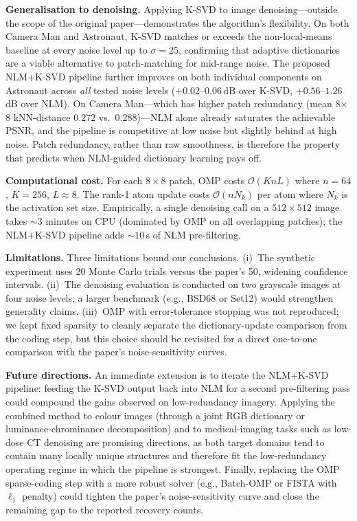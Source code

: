 \documentclass[conference]{IEEEtran}
\begin{document}
\textbf{Generalisation to denoising.}
Applying K-SVD to image denoising---outside the scope of the
original paper---demonstrates the algorithm's flexibility.
On both Camera Man and Astronaut, K-SVD matches or exceeds the
non-local-means baseline at every noise level up to $\sigma=25$,
confirming that adaptive dictionaries are a viable alternative
to patch-matching for mid-range noise.
The proposed NLM+K-SVD pipeline further improves on both
individual components on Astronaut across \emph{all} tested
noise levels ($+0.02$--$0.06$\,dB over K-SVD, $+0.56$--$1.26$\,dB
over NLM).  On Camera Man---which has higher patch redundancy
(mean 8$\times$8 kNN-distance $0.272$ vs.\ $0.288$)---NLM alone
already saturates the achievable PSNR, and the pipeline is
competitive at low noise but slightly behind at high noise.
Patch redundancy, rather than raw smoothness, is therefore the
property that predicts when NLM-guided dictionary learning
pays off.

\textbf{Computational cost.}
For each $8\!\times\!8$ patch, OMP costs
$\mathcal{O}(K n L)$ where $n=64$, $K=256$, $L\!\approx\!8$.
The rank-1 atom update costs $\mathcal{O}(n N_k)$ per atom
where $N_k$ is the activation set size.  Empirically, a single
denoising call on a $512\!\times\!512$ image takes ${\sim}3$
minutes on CPU (dominated by OMP on all overlapping patches);
the NLM+K-SVD pipeline adds ${\sim}10$\,s of NLM pre-filtering.

\textbf{Limitations.}
Three limitations bound our conclusions.
(i)~The synthetic experiment uses 20 Monte Carlo trials versus
the paper's 50, widening confidence intervals.
(ii)~The denoising evaluation is conducted on two grayscale
images at four noise levels; a larger benchmark (e.g., BSD68
or Set12) would strengthen generality claims.
(iii)~OMP with error-tolerance stopping was not reproduced; we
kept fixed sparsity to cleanly separate the dictionary-update
comparison from the coding step, but this choice should be
revisited for a direct one-to-one comparison with the paper's
noise-sensitivity curves.

\textbf{Future directions.}
An immediate extension is to iterate the NLM+K-SVD pipeline:
feeding the K-SVD output back into NLM for a second pre-filtering
pass could compound the gains observed on low-redundancy
imagery.
Applying the combined method to colour images (through a joint
RGB dictionary or luminance-chrominance decomposition) and to
medical-imaging tasks such as low-dose CT denoising are
promising directions, as both target domains tend to contain
many locally unique structures and therefore fit the
low-redundancy operating regime in which the pipeline is
strongest.
Finally, replacing the OMP sparse-coding step with a more
robust solver (e.g., Batch-OMP or FISTA with $\ell_1$
penalty) could tighten the paper's noise-sensitivity curve
and close the remaining gap to the reported recovery
counts.
\end{document}
